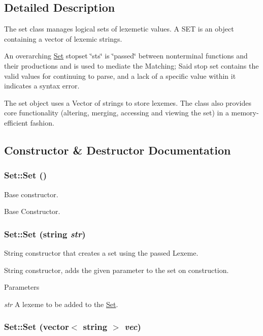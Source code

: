 \subsection{Detailed Description}
The set class manages logical sets of lexemetic values. A SET is an object containing a vector of lexemic strings.

An overarching \hyperlink{classSet}{Set} stopset \char`\"{}sts\char`\"{} is \char`\"{}passed\char`\"{} between nonterminal functions and their productions and is used to mediate the Matching; Said stop set contains the valid values for continuing to parse, and a lack of a specific value within it indicates a syntax error.

The set object uses a Vector of strings to store lexemes. The class also provides core functionality (altering, merging, accessing and viewing the set) in a memory-\/efficient fashion. 

\subsection{Constructor \& Destructor Documentation}
\hypertarget{classSet_a1c5d4bec6a962eb5805cf9a7321e241d}{
\subsubsection[{Set}]{\setlength{\rightskip}{0pt plus 5cm}Set::Set ()}}
\label{classSet_a1c5d4bec6a962eb5805cf9a7321e241d}


Base constructor. 

Base Constructor.\hypertarget{classSet_a6391cf8d2fcee12b6163ebc652f57d1e}{
\subsubsection[{Set}]{\setlength{\rightskip}{0pt plus 5cm}Set::Set (string {\em str})}}
\label{classSet_a6391cf8d2fcee12b6163ebc652f57d1e}


String constructor that creates a set using the passed Lexeme. 

String constructor, adds the given parameter to the set on construction.


\begin{DoxyParams}{Parameters}
\item[{\em str}]A lexeme to be added to the \hyperlink{classSet}{Set}. \end{DoxyParams}
\hypertarget{classSet_a9208c95d5e0d0fcbec93ebc9697d2d8a}{
\subsubsection[{Set}]{\setlength{\rightskip}{0pt plus 5cm}Set::Set (vector$<$ string $>$ {\em vec})}}
\label{classSet_a9208c95d5e0d0fcbec93ebc9697d2d8a}


